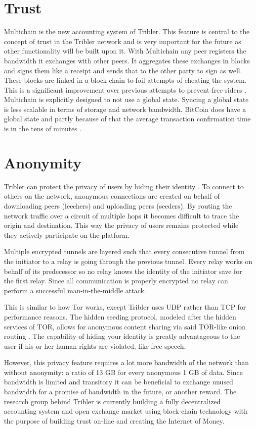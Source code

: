 \section{Trust}
Multichain is the new accounting system of Tribler.
This feature is central to the concept of trust in the Tribler network and is very important for the future as other functionality will be built upon it.
With Multichain any peer registers the bandwidth it exchanges with other peers.
It aggregates these exchanges in blocks and signs them like a receipt and sends that to the other party to sign as well.
These blocks are linked in a block-chain to foil attempts of cheating the system.
This is a significant improvement over previous attempts to prevent free-riders \cite{JanDavidFFFPaperIEEE2008,mol2008a,bartercast, multichain}.
Multichain is explicitly designed to not use a global state.
Syncing a global state is less scalable in terms of storage and network bandwidth.
BitCoin does have a global state and partly because of that the average transaction confirmation time is in the tens of minutes \cite{bitcoin_avg-confirmation-time}.


\section{Anonymity}
Tribler can protect the privacy of users by hiding their identity \cite{anon_internet, tribler-anon-hd, anon_HD_streaming}.
To connect to others on the network, anonymous connections are created on behalf of downloading peers (leechers) and uploading peers (seeders).
By routing the network traffic over a circuit of multiple hops it becomes difficult to trace the origin and destination.
This way the privacy of users remains protected while they actively participate on the platform.

Multiple encrypted tunnels are layered such that every consecutive tunnel from the initiator to a relay is going through the previous tunnel.
Every relay works on behalf of its predecessor so no relay knows the identity of the initiator save for the first relay.
Since all communication is properly encrypted no relay can perform a successful man-in-the-middle attack.

This is similar to how Tor works, except Tribler uses UDP rather than TCP for performance reasons.
The hidden seeding protocol, modeled after the hidden services of TOR, allows for anonymous content sharing via said TOR-like onion routing \cite{tor_bittorrent}.
The capability of hiding your identity is greatly advantageous to the user if his or her human rights are violated, like free speech.

However, this privacy feature requires a lot more bandwidth of the network than without anonymity: a ratio of 13 GB for every anonymous 1 GB of data.
Since bandwidth is limited and transitory it can be beneficial to exchange unused bandwidth for a promise of bandwidth in the future, or another reward.
The research group behind Tribler is currently building a fully decentralized accounting system and open exchange market using block-chain technology with the purpose of building trust on-line and creating the Internet of Money.

